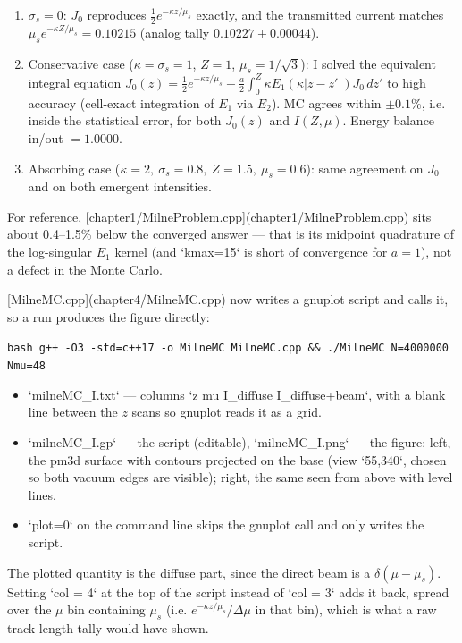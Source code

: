 \documentclass[11pt,a4paper]{article}
\theoremstyle{remark}
\begin{document}
\begin{enumerate}
\item $\sigma_s=0$: $J_0$ reproduces $\tfrac12 e^{-\kappa z/\mu_s}$ exactly, and the transmitted current matches $\mu_s e^{-\kappa Z/\mu_s}=0.10215$ (analog tally $0.10227\pm0.00044$).
\item Conservative case ($\kappa=\sigma_s=1$, $Z=1$, $\mu_s=1/\sqrt3$): I solved the equivalent integral equation $J_0(z)=\tfrac12 e^{-\kappa z/\mu_s}+\tfrac{a}{2}\int_0^Z \kappa E_1(\kappa|z-z'|)J_0\,dz'$ to high accuracy (cell-exact integration of $E_1$ via $E_2$). MC agrees within $\pm0.1\%$, i.e. inside the statistical error, for both $J_0(z)$ and $I(Z,\mu)$. Energy balance in/out $=1.0000$.
\item Absorbing case ($\kappa=2,\ \sigma_s=0.8,\ Z=1.5,\ \mu_s=0.6$): same agreement on $J_0$ and on both emergent intensities.
\end{enumerate}
For reference, [chapter1/MilneProblem.cpp](chapter1/MilneProblem.cpp) sits about 0.4–1.5\% below the converged answer — that is its midpoint quadrature of the log-singular $E_1$ kernel (and `kmax=15` is short of convergence for $a=1$), not a defect in the Monte Carlo.

[MilneMC.cpp](chapter4/MilneMC.cpp) now writes a gnuplot script and calls it, so a run produces the figure directly:

\texttt{bash
g++ -O3 -std=c++17 -o MilneMC MilneMC.cpp \&\& ./MilneMC N=4000000 Nmu=48}

\begin{itemize}
\item `milneMC\_I.txt` — columns `z  mu  I\_diffuse  I\_diffuse+beam`, with a blank line between the $z$ scans so gnuplot reads it as a grid.

\item `milneMC\_I.gp` — the script (editable), `milneMC\_I.png` — the figure: left, the pm3d surface with contours projected on the base (view `55,340`, chosen so both vacuum edges are visible); right, the same seen from above with level lines.

\item `plot=0` on the command line skips the gnuplot call and only writes the script.
\end{itemize}

The plotted quantity is the diffuse part, since the direct beam is a $\delta(\mu-\mu_s)$. Setting `col = 4` at the top of the script instead of `col = 3` adds it back, spread over the $\mu$ bin containing $\mu_s$ (i.e. $e^{-\kappa z/\mu_s}/\Delta\mu$ in that bin), which is what a raw track-length tally would have shown.
\end{document}

